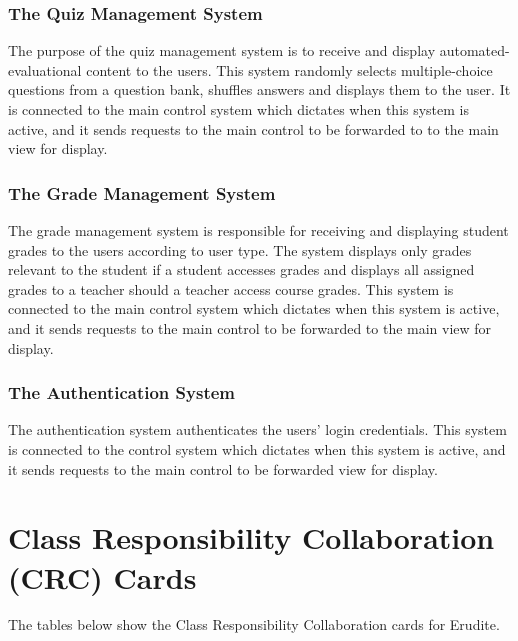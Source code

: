 \documentclass[]{article}
\begin{document}
\subsubsection{The Quiz Management System}
The purpose of the quiz management system is to receive and display 
automated-evaluational content to the users. This system randomly selects 
multiple-choice questions from a question bank, shuffles answers and displays 
them to the user. It is connected to the main control system which dictates when 
this 
system is active, and it sends requests to the main control to be forwarded to 
 to the main view for display.

\subsubsection{The Grade Management System}
The grade management system is responsible for receiving and displaying student 
grades to the users according to user type. The system displays only grades 
relevant to the student if a student accesses grades and displays all assigned 
grades to a teacher should a teacher access course grades. This system is 
connected to the main control system which dictates when this system is active, 
and 
it sends requests to the main control to be forwarded to the main view for 
display.

\subsubsection{The Authentication System}
The authentication system authenticates the users' login credentials. This 
system is 
connected to the control system which dictates when this system is active, and 
it sends requests to the main control to be forwarded view for display.



\section{Class Responsibility Collaboration (CRC) Cards}
\label{sec:class_responsibility_collaboration_crc_cards}
The tables below show the Class Responsibility Collaboration cards for Erudite.
	
	
\end{document}
